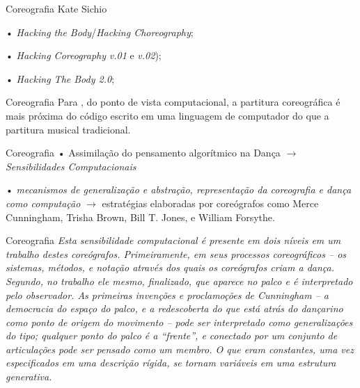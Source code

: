 \documentclass[aspectratio=169]{beamer}
\begin{document}
\begin{frame}{Coreografia}
Kate Sichio

• \emph{Hacking the Body}/\emph{Hacking Choreography};

• \emph{Hacking Coreography} \emph{v.01} e \emph{v.02});

• \emph{Hacking The Body 2.0};
\end{frame}

\begin{frame}{Coreografia}
Para , do ponto de vista computacional, a partitura coreográfica é mais próxima do código escrito em uma linguagem de computador do que a partitura musical tradicional. 
\end{frame}

\begin{frame}{Coreografia}
• Assimilação do pensamento algorítmico na Dança $\rightarrow$ \emph{Sensibilidades Computacionais}  

• \emph{mecanismos de generalização e abstração, representação da coreografia e dança como computação} \cite[cap.~1, p.~2--4]{downie_choreography_2005} $\rightarrow$ estratégias elaboradas por coreógrafos como Merce Cunningham, Trisha Brown, Bill T. Jones, e William Forsythe.
\end{frame}

\begin{frame}{Coreografia}
\emph{Esta sensibilidade computacional é presente em dois níveis em um trabalho destes coreógrafos. Primeiramente, em seus processos coreográficos -- os sistemas, métodos, e notação através dos quais os coreógrafos criam a dança. Segundo, no trabalho ele mesmo, finalizado, que aparece no palco e é interpretado pelo observador. As primeiras invenções e proclamoções de Cunningham -- a democracia do espaço do palco, e a redescoberta do que está atrás do dançarino como ponto de origem do movimento -- pode ser interpretado como generalizações do tipo; qualquer ponto do palco é a ``frente'', e conectado por um conjunto de articulações pode ser pensado como um membro. O que eram constantes, uma vez especificados em uma descrição rígida, se tornam variáveis em uma estrutura generativa.}\cite[cap.~1, p.~2--4]{downie_choreography_2005}
\end{frame}
\end{document}
